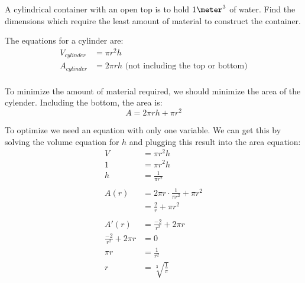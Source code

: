 \documentclass[fleqn,addpoints]{exam}
\begin{document}
\begin{questions}
\begin{solution}
\end{solution}

\pagebreak


\question[15]

A cylindrical container with an open top is to hold $1 \meter^3$ of water.  Find the dimensions which require the least
amount of material to construct the container.

The equations for a cylinder are:
\begin{align*}
  V_{cylinder} &= \pi r^2 h \\
  A_{cylinder} &= 2 \pi r h \text{ (not including the top or bottom)} \\
\end{align*}

\begin{solution}
To minimize the amount of material required, we should  minimize the area of the cylender.  Including the bottom, the area is:
\[
    A = 2 \pi r h + \pi r^2
\]

To optimize we need an equation with only one variable.  We can get this by solving the volume equation for $h$ and
plugging this result into the area equation: 
\begin{align*}
  V &= \pi r^2 h \\
  1 &= \pi r^2 h \\
  h &= \frac{1}{\pi r^2} \\
\\
  A(r) &= 2 \pi r \cdot \frac{1}{\pi r^2} + \pi r^2 \\
       &= \frac{2}{r} + \pi r^2 \\
\\
  A'(r) &= \frac{-2}{r^2} + 2 \pi r \\
  \frac{-2}{r^2} + 2 \pi r &= 0 \\
  \pi r &= \frac{1}{r^2}  \\
  r &= \sqrt[3]{\frac{1}{\pi}} \\
\end{align*}


\end{solution}

\pagebreak




\end{questions}
\end{document}
